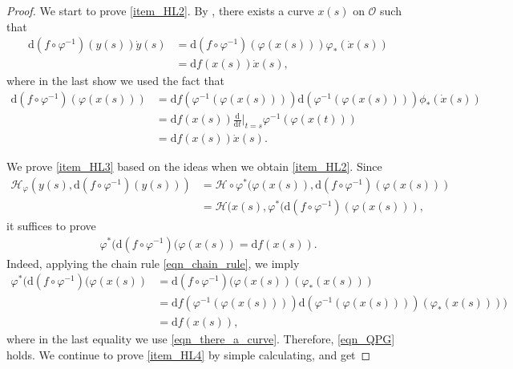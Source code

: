 \documentclass[a4paper]{article}
\numberwithin{equation}{section}
\theoremstyle{definition}
\begin{document}
\begin{proof}
	We start to prove
	\cref{item_HL2}. By , 
	there exists a curve $x(s)$ on $\mathcal{O}$ such that
	\begin{align*}
		\mathrm{d}(f\circ\varphi^{-1})(y(s))\dot{y}(s)&=\mathrm{d}(f\circ \varphi^{-1})(\varphi(x(s)))\varphi_{*}(\dot{x}(s))\\
		&=\mathrm{d}f(x(s))\dot{x}(s),
	\end{align*}
	where in the last show we used the fact that
	\begin{equation}\label{eqn_there_a_curve}
		\begin{split}
			\mathrm{d}(f\circ \varphi^{-1})(\varphi(x(s)))&=\mathrm{d}f(\varphi^{-1}(\varphi(x(s))))\mathrm{d}(\varphi^{-1}(\varphi(x(s))))\phi_{*}(\dot{x}(s))\\
			&=\mathrm{d}f(x(s))\frac{\mathrm{d}}{\mathrm{d}t}\bigg|_{t=s}\varphi^{-1}
			(\varphi(x(t)))\\
			&=\mathrm{d}f(x(s))\dot{x}(s).
		\end{split}
	\end{equation}
	\par
	We prove \cref{item_HL3} based on the ideas when we obtain \cref{item_HL2}.
	Since
	\begin{align*}
		\mathcal{H}_{\varphi}(y(s),\mathrm{d} (f\circ \varphi^{-1})(y(s)))&=\mathcal{H}\circ \varphi^*(\varphi(x(s)),\mathrm{d}(f\circ \varphi^{-1})(\varphi(x(s)))\\
		&=\mathcal{H}(x(s),\varphi^*(\mathrm{d}(f\circ \varphi^{-1})(\varphi(x(s))),
	\end{align*}
	it suffices to prove
	\begin{align}\label{eqn_QPG}
		\varphi^*(\mathrm{d}(f\circ \varphi^{-1})(\varphi(x(s))=\mathrm{d}f(x(s)).
	\end{align}
	Indeed, applying the chain rule \eqref{eqn_chain_rule}, we imply 
	\begin{align*}
		\varphi^*(\mathrm{d}(f\circ \varphi^{-1})(\varphi(x(s))
		&=\mathrm{d}(f\circ \varphi^{-1})(\varphi(x(s))(\varphi_{*}(x(s)))\\
		&=\mathrm{d}f(\varphi^{-1}(\varphi(x(s))))\mathrm{d}(\varphi^{-1}(\varphi(x(s))))(\varphi_{*}(x(s))))\\
		&
		=\mathrm{d}f(x(s)),
	\end{align*}
	where in the last equality we use \eqref{eqn_there_a_curve}.
	Therefore, \eqref{eqn_QPG} holds. We continue to prove \cref{item_HL4} by simple calculating, and get 

\end{proof}
\end{document}
